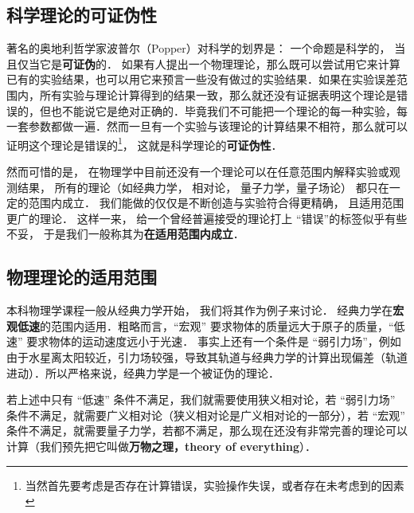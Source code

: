 

\subsection{科学理论的可证伪性}

著名的奥地利哲学家波普尔（Popper）对科学的划界是： 一个命题是科学的， 当且仅当它是\textbf{可证伪}的． 如果有人提出一个物理理论，那么既可以尝试用它来计算已有的实验结果，也可以用它来预言一些没有做过的实验结果．如果在实验误差范围内，所有实验与理论计算得到的结果一致，那么就还没有证据表明这个理论是错误的，但也不能说它是绝对正确的．毕竟我们不可能把一个理论的每一种实验，每一套参数都做一遍．然而一旦有一个实验与该理论的计算结果不相符，那么就可以证明这个理论是错误的\footnote{当然首先要考虑是否存在计算错误，实验操作失误，或者存在未考虑到的因素}， 这就是科学理论的\textbf{可证伪性}．

然而可惜的是， 在物理学中目前还没有一个理论可以在任意范围内解释实验或观测结果， 所有的理论（如经典力学， 相对论， 量子力学，量子场论） 都只在一定的范围内成立． 我们能做的仅仅是不断创造与实验符合得更精确， 且适用范围更广的理论． 这样一来， 给一个曾经普遍接受的理论打上 “错误”的标签似乎有些不妥， 于是我们一般称其为\textbf{在适用范围内成立}．

\subsection{物理理论的适用范围}
本科物理学课程一般从经典力学开始， 我们将其作为例子来讨论． 经典力学在\textbf{宏观低速}的范围内适用．粗略而言，“宏观” 要求物体的质量远大于原子的质量，“低速” 要求物体的运动速度远小于光速． 事实上还有一个条件是 “弱引力场”，例如由于水星离太阳较近，引力场较强，导致其轨道与经典力学的计算出现偏差（轨道进动）．所以严格来说，经典力学是一个被证伪的理论．

若上述中只有 “低速” 条件不满足，我们就需要使用狭义相对论，若 “弱引力场” 条件不满足，就需要广义相对论（狭义相对论是广义相对论的一部分），若 “宏观” 条件不满足，就需要量子力学，若都不满足，那么现在还没有非常完善的理论可以计算（我们预先把它叫做\textbf{万物之理，theory of everything}）．

